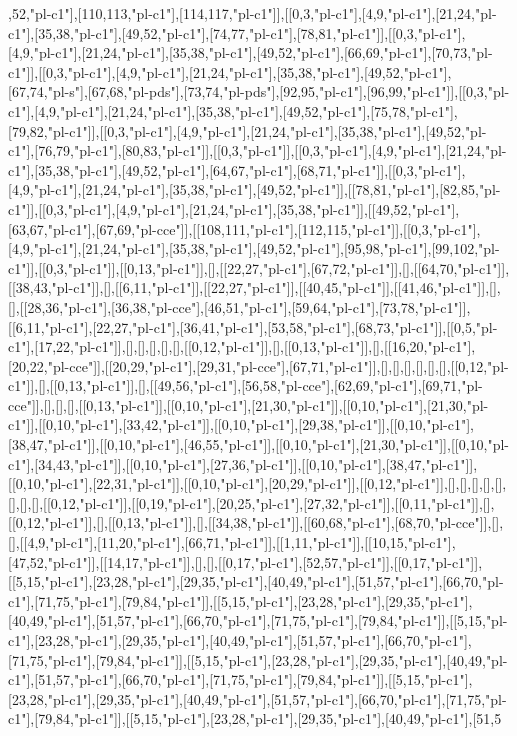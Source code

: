 ,52,"pl-c1"],[110,113,"pl-c1"],[114,117,"pl-c1"]],[[0,3,"pl-c1"],[4,9,"pl-c1"],[21,24,"pl-c1"],[35,38,"pl-c1"],[49,52,"pl-c1"],[74,77,"pl-c1"],[78,81,"pl-c1"]],[[0,3,"pl-c1"],[4,9,"pl-c1"],[21,24,"pl-c1"],[35,38,"pl-c1"],[49,52,"pl-c1"],[66,69,"pl-c1"],[70,73,"pl-c1"]],[[0,3,"pl-c1"],[4,9,"pl-c1"],[21,24,"pl-c1"],[35,38,"pl-c1"],[49,52,"pl-c1"],[67,74,"pl-s"],[67,68,"pl-pds"],[73,74,"pl-pds"],[92,95,"pl-c1"],[96,99,"pl-c1"]],[[0,3,"pl-c1"],[4,9,"pl-c1"],[21,24,"pl-c1"],[35,38,"pl-c1"],[49,52,"pl-c1"],[75,78,"pl-c1"],[79,82,"pl-c1"]],[[0,3,"pl-c1"],[4,9,"pl-c1"],[21,24,"pl-c1"],[35,38,"pl-c1"],[49,52,"pl-c1"],[76,79,"pl-c1"],[80,83,"pl-c1"]],[[0,3,"pl-c1"]],[[0,3,"pl-c1"],[4,9,"pl-c1"],[21,24,"pl-c1"],[35,38,"pl-c1"],[49,52,"pl-c1"],[64,67,"pl-c1"],[68,71,"pl-c1"]],[[0,3,"pl-c1"],[4,9,"pl-c1"],[21,24,"pl-c1"],[35,38,"pl-c1"],[49,52,"pl-c1"]],[[78,81,"pl-c1"],[82,85,"pl-c1"]],[[0,3,"pl-c1"],[4,9,"pl-c1"],[21,24,"pl-c1"],[35,38,"pl-c1"]],[[49,52,"pl-c1"],[63,67,"pl-c1"],[67,69,"pl-cce"]],[[108,111,"pl-c1"],[112,115,"pl-c1"]],[[0,3,"pl-c1"],[4,9,"pl-c1"],[21,24,"pl-c1"],[35,38,"pl-c1"],[49,52,"pl-c1"],[95,98,"pl-c1"],[99,102,"pl-c1"]],[[0,3,"pl-c1"]],[[0,13,"pl-c1"]],[],[[22,27,"pl-c1"],[67,72,"pl-c1"]],[],[[64,70,"pl-c1"]],[[38,43,"pl-c1"]],[],[[6,11,"pl-c1"]],[[22,27,"pl-c1"]],[[40,45,"pl-c1"]],[[41,46,"pl-c1"]],[],[],[[28,36,"pl-c1"],[36,38,"pl-cce"],[46,51,"pl-c1"],[59,64,"pl-c1"],[73,78,"pl-c1"]],[[6,11,"pl-c1"],[22,27,"pl-c1"],[36,41,"pl-c1"],[53,58,"pl-c1"],[68,73,"pl-c1"]],[[0,5,"pl-c1"],[17,22,"pl-c1"]],[],[],[],[],[],[[0,12,"pl-c1"]],[],[[0,13,"pl-c1"]],[],[[16,20,"pl-c1"],[20,22,"pl-cce"]],[[20,29,"pl-c1"],[29,31,"pl-cce"],[67,71,"pl-c1"]],[],[],[],[],[],[],[[0,12,"pl-c1"]],[],[[0,13,"pl-c1"]],[],[[49,56,"pl-c1"],[56,58,"pl-cce"],[62,69,"pl-c1"],[69,71,"pl-cce"]],[],[],[],[[0,13,"pl-c1"]],[[0,10,"pl-c1"],[21,30,"pl-c1"]],[[0,10,"pl-c1"],[21,30,"pl-c1"]],[[0,10,"pl-c1"],[33,42,"pl-c1"]],[[0,10,"pl-c1"],[29,38,"pl-c1"]],[[0,10,"pl-c1"],[38,47,"pl-c1"]],[[0,10,"pl-c1"],[46,55,"pl-c1"]],[[0,10,"pl-c1"],[21,30,"pl-c1"]],[[0,10,"pl-c1"],[34,43,"pl-c1"]],[[0,10,"pl-c1"],[27,36,"pl-c1"]],[[0,10,"pl-c1"],[38,47,"pl-c1"]],[[0,10,"pl-c1"],[22,31,"pl-c1"]],[[0,10,"pl-c1"],[20,29,"pl-c1"]],[[0,12,"pl-c1"]],[],[],[],[],[],[],[],[],[[0,12,"pl-c1"]],[[0,19,"pl-c1"],[20,25,"pl-c1"],[27,32,"pl-c1"]],[[0,11,"pl-c1"]],[],[[0,12,"pl-c1"]],[],[[0,13,"pl-c1"]],[],[[34,38,"pl-c1"]],[[60,68,"pl-c1"],[68,70,"pl-cce"]],[],[],[[4,9,"pl-c1"],[11,20,"pl-c1"],[66,71,"pl-c1"]],[[1,11,"pl-c1"]],[[10,15,"pl-c1"],[47,52,"pl-c1"]],[[14,17,"pl-c1"]],[],[],[[0,17,"pl-c1"],[52,57,"pl-c1"]],[[0,17,"pl-c1"]],[[5,15,"pl-c1"],[23,28,"pl-c1"],[29,35,"pl-c1"],[40,49,"pl-c1"],[51,57,"pl-c1"],[66,70,"pl-c1"],[71,75,"pl-c1"],[79,84,"pl-c1"]],[[5,15,"pl-c1"],[23,28,"pl-c1"],[29,35,"pl-c1"],[40,49,"pl-c1"],[51,57,"pl-c1"],[66,70,"pl-c1"],[71,75,"pl-c1"],[79,84,"pl-c1"]],[[5,15,"pl-c1"],[23,28,"pl-c1"],[29,35,"pl-c1"],[40,49,"pl-c1"],[51,57,"pl-c1"],[66,70,"pl-c1"],[71,75,"pl-c1"],[79,84,"pl-c1"]],[[5,15,"pl-c1"],[23,28,"pl-c1"],[29,35,"pl-c1"],[40,49,"pl-c1"],[51,57,"pl-c1"],[66,70,"pl-c1"],[71,75,"pl-c1"],[79,84,"pl-c1"]],[[5,15,"pl-c1"],[23,28,"pl-c1"],[29,35,"pl-c1"],[40,49,"pl-c1"],[51,57,"pl-c1"],[66,70,"pl-c1"],[71,75,"pl-c1"],[79,84,"pl-c1"]],[[5,15,"pl-c1"],[23,28,"pl-c1"],[29,35,"pl-c1"],[40,49,"pl-c1"],[51,5